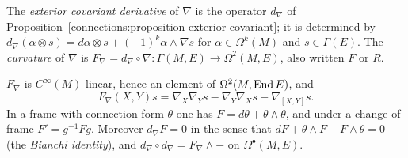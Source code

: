 \begin{definition}\label{connections:definition-curvature}
The \emph{exterior covariant derivative} of $\nabla$ is the operator $d_\nabla$ of Proposition~\ref{connections:proposition-exterior-covariant}; it is determined by
$d_\nabla(\alpha \otimes s) = d\alpha \otimes s + (-1)^k\alpha \wedge \nabla s$ for $\alpha \in \Omega^k(M)$ and $s \in \Gamma(E)$. The \emph{curvature} of $\nabla$ is
$F_\nabla = d_\nabla \circ \nabla \colon \Gamma(M, E) \to \Omega^2(M, E)$, also written $F$ or $R$.
\end{definition}

\begin{proposition}\label{connections:proposition-curvature}
$F_\nabla$ is $C^\infty(M)$-linear, hence an element of $\Omega^2(M, \operatorname{End} E)$, and
\[
F_\nabla(X, Y)s = \nabla_X\nabla_Ys - \nabla_Y\nabla_Xs - \nabla_{[X, Y]}s .
\]
In a frame with connection form $\theta$ one has $F = d\theta + \theta \wedge \theta$, and under a change of frame $F' = g^{-1}Fg$. Moreover $d_\nabla F = 0$ in the sense that
$dF + \theta \wedge F - F \wedge \theta = 0$ (the \emph{Bianchi identity}), and $d_\nabla \circ d_\nabla = F_\nabla \wedge -$ on $\Omega^\bullet(M, E)$.
\end{proposition}

